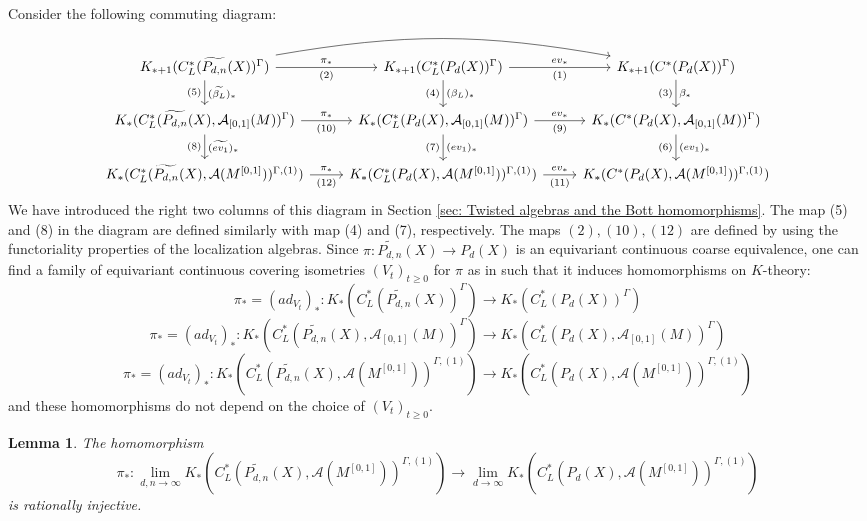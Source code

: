 \documentclass[11pt]{article}
\theoremstyle{definition}
\theoremstyle{plain}
\newtheorem{Lem}[Def]{Lemma}
\def\A{\mathcal A}\def\C{\mathcal C}\def\B{\mathcal B}\def\E{\mathcal E}\def\O{\mathcal O}\def\h{\mathfrak h}\def\K{\mathcal K}\def\F{\mathcal F}\def\P{\mathcal P}\def\L{\mathcal L}\def\R{\mathcal R}\def\Q{\mathcal Q}\def\H{\mathcal H}\def\S{\mathcal S}\def\N{\mathcal N}\def\U{\mathcal U}\def\V{\mathcal V}
\def\MRdnX{\widetilde{P_{d,n}}(X)}
\def\Ga{\Gamma}
\begin{document}
Consider the following commuting diagram:
\begin{equation}\begin{tikzcd}\label{main diam}
K_{*+1}(C^*_L(\MRdnX)^{\Ga}) \arrow[r, "\pi_*", "(2)"'] \arrow[rr,  bend left=10] \arrow[d, "(\widetilde{\beta_L})_*", "(5)"'] & K_{*+1}(C^*_L(P_d(X))^{\Ga}) \arrow[r, "ev_*","(1)"'] \arrow[d, "(\beta_L)_*", "(4)"'] & K_{*+1}(C^*(P_d(X))^{\Ga}) \arrow[d, "\beta_*", "(3)"']   \\
K_*(C^*_L(\MRdnX,\A_{[0,1]}(M))^{\Ga}) \arrow[r, "\pi_*","(10)"'] \arrow[d, "(\widetilde{ev_1})_*", "(8)"']  & K_*(C^*_L(P_d(X),\A_{[0,1]}(M))^{\Ga})\arrow[r, "ev_*","(9)"'] \arrow[d, "(ev_1)_*","(7)"']& K_*(C^*(P_d(X),\A_{[0,1]}(M))^{\Ga}) \arrow[d, "(ev_1)_*","(6)"']\\
K_*(C^*_L(\MRdnX,\A(M^{[0,1]}))^{\Ga,(1)}) \arrow[r, "\pi_*","(12)"']& K_*(C^*_L(P_d(X),\A(M^{[0,1]}))^{\Ga,(1)})\arrow[r, "ev_*","(11)"'] & K_*(C^*(P_d(X),\A(M^{[0,1]}))^{\Ga,(1)})
\end{tikzcd}\end{equation}
We have introduced the right two columns of this diagram in Section \ref{sec: Twisted algebras and the Bott homomorphisms}. The map (5) and (8) in the diagram are defined similarly with map (4) and (7), respectively. The maps $(2),(10),(12)$ are defined by using the functoriality properties of the localization algebras. Since $\pi:\MRdnX\to P_d(X)$ is an equivariant continuous coarse equivalence, one can find a family of equivariant continuous covering isometries $(V_t)_{t\geq 0}$ for $\pi$ as in \cite[Proposition 4.5.12]{HIT2020} such that it induces homomorphisms on $K$-theory:
$$\pi_*=(ad_{V_t})_*:K_*(C^*_L(\MRdnX)^{\Ga})\to K_*(C^*_L(P_d(X))^{\Ga})$$
$$\pi_*=(ad_{V_t})_*:K_*(C^*_L(\MRdnX,\A_{[0,1]}(M))^{\Ga})\to K_*(C^*_L(P_d(X),\A_{[0,1]}(M))^{\Ga})$$
$$\pi_*=(ad_{V_t})_*:K_*(C^*_L(\MRdnX,\A(M^{[0,1]}))^{\Ga,(1)})\to K_*(C^*_L(P_d(X),\A(M^{[0,1]}))^{\Ga,(1)})$$
and these homomorphisms do not depend on the choice of $(V_t)_{t\geq0}$.

\begin{Lem}\label{pi is injective}
The homomorphism
$$\pi_*:\lim_{d,n\to\infty}K_*(C^*_L(\MRdnX,\A(M^{[0,1]}))^{\Ga,(1)})\to \lim_{d\to\infty}K_*(C^*_L(P_d(X),\A(M^{[0,1]}))^{\Ga,(1)})$$
is rationally injective.
\end{Lem}
\end{document}
